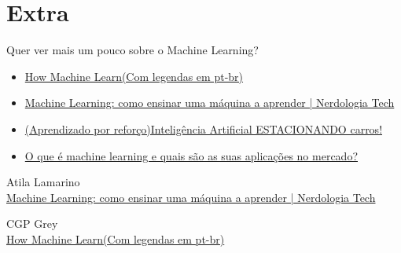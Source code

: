 \documentclass{article}
\begin{document}
    \section*{Extra}
    Quer ver mais um pouco sobre o Machine Learning?
    \begin{itemize}
        \item\href{https://www.youtube.com/watch?v=R9OHn5ZF4Uo&t}{How Machine Learn(Com legendas em pt-br)}
        \item\href{https://www.youtube.com/watch?v=mhe5e2B9bL8&t}{Machine Learning: como ensinar uma máquina a aprender | Nerdologia Tech}
        \item\href{https://www.youtube.com/watch?v=r8KWciNmEGw}{(Aprendizado por reforço)Inteligência Artificial ESTACIONANDO carros!} 
        \item\href{https://blog.wittel.com/o-que-e-machine-learning/}{O que é machine learning e quais são as suas aplicações no mercado?}
    \end{itemize}

    \clearpage
    \begin{thebibliography}{2}
    
    Atila Lamarino \\
    \href{https://www.youtube.com/watch?v=mhe5e2B9bL8&t}{Machine Learning: como ensinar uma máquina a aprender | Nerdologia Tech}

    CGP Grey \\
    \href{https://www.youtube.com/watch?v=R9OHn5ZF4Uo&t}{How Machine Learn(Com legendas em pt-br)}

    \end{thebibliography}    
\end{document}
